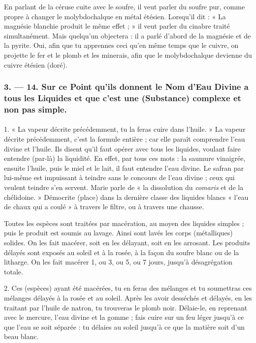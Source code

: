 \documentclass[a4paper, 11pt, oneside, polutonikogreek, french]{article}
\begin{document}
En parlant de la céruse cuite avec le soufre, il veut parler du soufre pur, comme propre à changer le molybdochalque en métal étésien. Lorsqu'il dit : « La magnésie blanchie produit le même effet ; » il veut parler du cinabre traité simultanément. Mais quelqu'un objectera : il a parlé d'abord de la magnésie et de la pyrite. Oui, afin que tu apprennes ceci qu'en même temps que le cuivre, on projette le fer et le plomb et les minerais, afin que le molybdochalque devienne du cuivre étésien (doré).

\bigskip
\centerline{\EightStarTaper}
\centerline{\EightStarTaper\EightStarTaper}
\bigskip

\subsubsection{3. --- 14. Sur ce Point qu'ils donnent le Nom d'Eau Divine a tous les Liquides et que c'est une (Substance) complexe et non pas simple.}
\paragraph{}
1. « La vapeur décrite précédemment, tu la feras cuire dans l'huile. » La vapeur décrite précédemment, c'est la formule entière ; car elle paraît comprendre l'eau divine et l'huile. Ils disent qu'il faut opérer avec tous les liquides, voulant faire entendre (par-là) la liquidité. En effet, par tous ces mots : la saumure vinaigrée, ensuite l'huile, puis le miel et le lait, il faut entendre l'eau divine. Le safran par lui-même est impuissant à teindre sans le concours de l'eau divine ; ceux qui veulent teindre s'en servent. Marie parle de « la dissolution du \emph{comaris} et de la chélidoine. » Démocrite (place) dans la dernière classe des liquides blancs « l'eau de chaux qui a coulé » à travers le filtre, ou à travers une chausse.

Toutes les espèces sont traitées par macération, au moyen des liquides simples ; puis le produit est soumis au lavage. Ainsi sont lavés les corps (métalliques) solides. On les fait macérer, soit en les délayant, soit en les arrosant. Les produits délayés sont exposés au soleil et à la rosée, à la façon du soufre blanc ou de la litharge. On les fait macérer 1, ou 3, ou 5, ou 7 jours, jusqu'à désagrégation totale.

2. Ces (espèces) ayant été macérées, tu en feras des mélanges et tu soumettras ces mélanges délayés à la rosée et au soleil. Après les avoir desséchés et délayés, en les traitant par l'huile de natron, tu trouveras le plomb noir. Délaie-le, en reprenant avec le mercure, l'eau divine et la gomme ; fais cuire sur un feu léger jusqu'à ce que l'eau se soit séparée : tu délaies au soleil jusqu'à ce que la matière soit d'un beau blanc.
\end{document}
